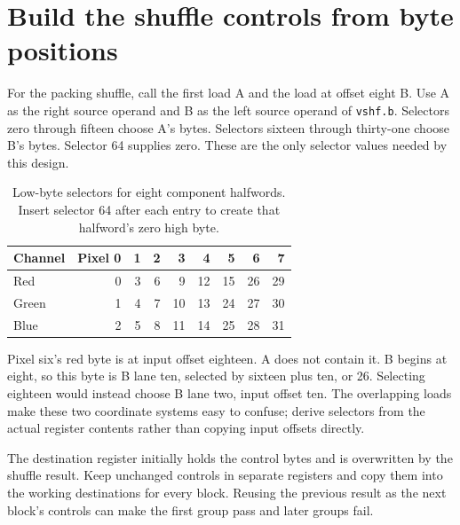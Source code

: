 \section{Build the shuffle controls from byte positions}\label{rgb-gather}
For the packing shuffle, call the first load A and the load at offset eight B.
Use A as the right source operand and B as the left source operand of
\texttt{vshf.b}. Selectors zero through fifteen choose A's bytes. Selectors sixteen
through thirty-one choose B's bytes. Selector 64 supplies zero. These are the only
selector values needed by this design.

\begin{table}[htbp]
  \centering
  \caption{Low-byte selectors for eight component halfwords. Insert selector 64 after each entry to create that halfword's zero high byte.}
  \begin{tabular}{lrrrrrrrr}
    \toprule
    Channel & Pixel 0 & 1 & 2 & 3  & 4  & 5  & 6  & 7  \\
    \midrule
    Red     & 0       & 3 & 6 & 9  & 12 & 15 & 26 & 29 \\
    Green   & 1       & 4 & 7 & 10 & 13 & 24 & 27 & 30 \\
    Blue    & 2       & 5 & 8 & 11 & 14 & 25 & 28 & 31 \\
    \bottomrule
  \end{tabular}
\end{table}

Pixel six's red byte is at input offset eighteen. A does not contain it. B begins
at eight, so this byte is B lane ten, selected by sixteen plus ten, or 26. Selecting
eighteen would instead choose B lane two, input offset ten. The overlapping loads
make these two coordinate systems easy to confuse; derive selectors from the actual
register contents rather than copying input offsets directly.

The destination register initially holds the control bytes and is overwritten by
the shuffle result. Keep unchanged controls in separate registers and copy them
into the working destinations for every block. Reusing the previous result as the
next block's controls can make the first group pass and later groups fail.
